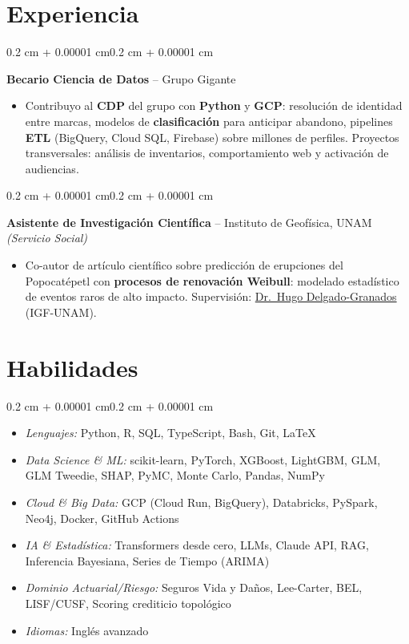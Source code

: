 \documentclass[10pt, letterpaper]{article}
\newenvironment{highlights}{
    \begin{itemize}[topsep=0.02 cm,parsep=0.05 cm,partopsep=0pt,itemsep=0pt,leftmargin=0.4 cm + 10pt]
}{\end{itemize}}
\newenvironment{highlightsforbulletentries}{
    \begin{itemize}[topsep=0.02 cm,parsep=0.02 cm,partopsep=0pt,itemsep=0pt,leftmargin=10pt]
}{\end{itemize}}
\newenvironment{onecolentry}{
    \begin{adjustwidth}{0.2 cm + 0.00001 cm}{0.2 cm + 0.00001 cm}
}{\end{adjustwidth}}
\let\hrefWithoutArrow\href
\renewcommand{\href}[2]{\hrefWithoutArrow{#1}{\ifthenelse{\equal{#2}{}}{ }{#2 }\raisebox{.15ex}{\footnotesize \faExternalLink*}}}
\begin{document}
    \section{Experiencia}
        \begin{onecolentry}
            \textbf{Becario Ciencia de Datos} -- Grupo Gigante
            \begin{highlights}
                \item Contribuyo al \textbf{CDP} del grupo con \textbf{Python} y \textbf{GCP}: resolución de identidad entre marcas, modelos de \textbf{clasificación} para anticipar abandono, pipelines \textbf{ETL} (BigQuery, Cloud SQL, Firebase) sobre millones de perfiles. Proyectos transversales: análisis de inventarios, comportamiento web y activación de audiencias.
            \end{highlights}
            \end{onecolentry}

        \vspace{0.02 cm}

        \begin{onecolentry}
            \textbf{Asistente de Investigación Científica} -- Instituto de Geofísica, UNAM \textit{(Servicio Social)}
            \begin{highlights}
                \item Co-autor de artículo científico sobre predicción de erupciones del Popocatépetl con \textbf{procesos de renovación Weibull}: modelado estadístico de eventos raros de alto impacto. Supervisión: \hrefWithoutArrow{https://scholar.google.com/citations?user=lDD0DZQAAAAJ}{Dr.\ Hugo Delgado-Granados} (IGF-UNAM).
            \end{highlights}
            \end{onecolentry}

    \section{Habilidades}
\begin{onecolentry}
    \begin{highlightsforbulletentries}
        \item \textit{Lenguajes:} Python, R, SQL, TypeScript, Bash, Git, \LaTeX
        \item \textit{Data Science \& ML:} scikit-learn, PyTorch, XGBoost, LightGBM, GLM, GLM Tweedie, SHAP, PyMC, Monte Carlo, Pandas, NumPy
        \item \textit{Cloud \& Big Data:} GCP (Cloud Run, BigQuery), Databricks, PySpark, Neo4j, Docker, GitHub Actions
        \item \textit{IA \& Estadística:} Transformers desde cero, LLMs, Claude API, RAG, Inferencia Bayesiana, Series de Tiempo (ARIMA)
        \item \textit{Dominio Actuarial/Riesgo:} Seguros Vida y Daños, Lee-Carter, BEL, LISF/CUSF, Scoring crediticio topológico
        \item \textit{Idiomas:} Inglés avanzado
    \end{highlightsforbulletentries}
\end{onecolentry}
\end{document}
